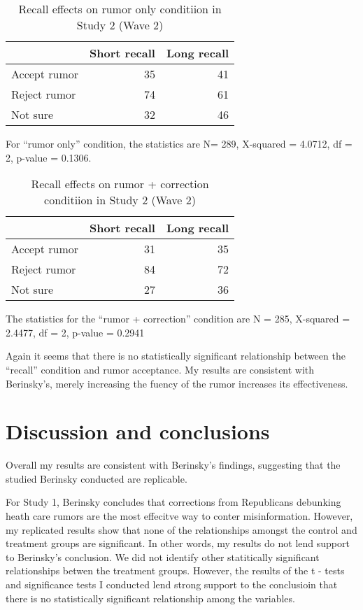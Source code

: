 \documentclass[AER]{AEA}
\begin{document}
\begin{table}[!h]

\caption{\label{tab:unnamed-chunk-18}Recall effects on rumor only conditiion in Study 2 (Wave 2)}
\centering
\begin{tabular}[t]{lrr}
\toprule
  & Short recall & Long recall\\
\midrule
Accept rumor & 35 & 41\\
Reject rumor & 74 & 61\\
Not sure & 32 & 46\\
\bottomrule
\end{tabular}
\end{table}

For ``rumor only'' condition, the statistics are N= 289, X-squared =
4.0712, df = 2, p-value = 0.1306.

\begin{table}[!h]

\caption{\label{tab:unnamed-chunk-19}Recall effects on rumor + correction conditiion in Study 2 (Wave 2)}
\centering
\begin{tabular}[t]{lrr}
\toprule
  & Short recall & Long recall\\
\midrule
Accept rumor & 31 & 35\\
Reject rumor & 84 & 72\\
Not sure & 27 & 36\\
\bottomrule
\end{tabular}
\end{table}

The statistics for the ``rumor + correction'' condition are N = 285,
X-squared = 2.4477, df = 2, p-value = 0.2941

Again it seems that there is no statistically significant relationship
between the ``recall'' condition and rumor acceptance. My results are
consistent with Berinsky's, merely increasing the fuency of the rumor
increases its effectiveness.

\hypertarget{discussion-and-conclusions}{%
\section{Discussion and conclusions}\label{discussion-and-conclusions}}

Overall my results are consistent with Berinsky's findings, suggesting
that the studied Berinsky conducted are replicable.

For Study 1, Berinsky concludes that corrections from Republicans
debunking heath care rumors are the most effecitve way to conter
misinformation. However, my replicated results show that none of the
relationships amongst the control and treatment groups are significant.
In other words, my results do not lend support to Berinsky's conclusion.
We did not identify other statitically significant relationships betwen
the treatment groups. However, the results of the t - tests and
significance tests I conducted lend strong support to the conclusioin
that there is no statistically significant relationship among the
variables.
\end{document}

